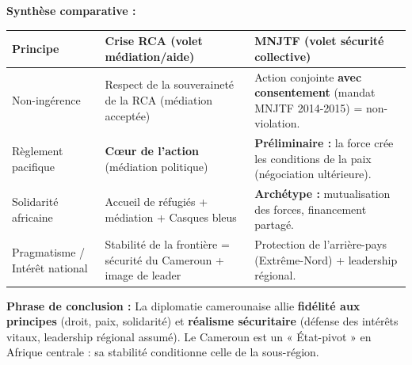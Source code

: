 \documentclass[11pt]{article}
\begin{document}
\begin{exoresolu}
\textbf{Synthèse comparative :}
\begin{center}
\begin{tabularx}{\linewidth}{|l|X|X|}
\hline
\textbf{Principe} & \textbf{Crise RCA (volet médiation/aide)} & \textbf{MNJTF (volet sécurité collective)} \\
\hline
Non-ingérence & Respect de la souveraineté de la RCA (médiation acceptée) & Action conjointe \textbf{avec consentement} (mandat MNJTF 2014-2015) = non-violation. \\
\hline
Règlement pacifique & \textbf{Cœur de l'action} (médiation politique) & \textbf{Préliminaire :} la force crée les conditions de la paix (négociation ultérieure). \\
\hline
Solidarité africaine & Accueil de réfugiés + médiation + Casques bleus & \textbf{Archétype :} mutualisation des forces, financement partagé. \\
\hline
Pragmatisme / Intérêt national & Stabilité de la frontière = sécurité du Cameroun + image de leader & Protection de l'arrière-pays (Extrême-Nord) + leadership régional. \\
\hline
\end{tabularx}
\end{center}
\textbf{Phrase de conclusion :} La diplomatie camerounaise allie \textbf{fidélité aux principes} (droit, paix, solidarité) et \textbf{réalisme sécuritaire} (défense des intérêts vitaux, leadership régional assumé). Le Cameroun est un « État-pivot » en Afrique centrale : sa stabilité conditionne celle de la sous-région.
\end{exoresolu}
\end{document}
